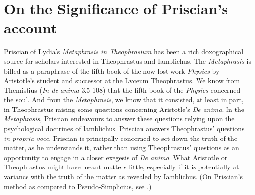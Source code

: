 \documentclass[12pt]{article}
\title{\mytitle}
\author{\myauthor}
\date{} %
\begin{document}
\maketitle
\begin{abstract} %
\noindent An \emph{aporia} posed by Theophrastus prompts Priscian to describe the process by which perception formally assimilates to its object as a progressive perfection. I present an interpretation of Priscian's account of perception's progressive perfection. And I consider a dilemma for the general class of accounts to which Priscian's belongs based on related problems raised by Plotinus and Aquinas.
\end{abstract}

\setlength{\parindent}{1em}


\section{On the Significance of Priscian's account} %
\label{sec:on_the_significance_of_priscian_s_account}

Priscian of Lydia's \emph{Metaphrasis in Theophrastum} has been a rich doxographical source for scholars interested in Theophrastus and Iamblichus. The \emph{Metaphrasis} is billed as a paraphrase of the fifth book of the now lost work \emph{Physics} by Aristotle's student and successor at the Lyceum Theophrastus. We know from Themistius (\emph{In de anima} 3.5 108) that the fifth book of the \emph{Physics} concerned the soul. And from the \emph{Metaphrasis}, we know that it consisted, at least in part, in Theophrastus raising some questions concerning Aristotle's \emph{De anima}. In the \emph{Metaphrasis}, Priscian endeavours to answer these questions relying upon the psychological doctrines of Iamblichus. Priscian answers Theophrastus' questions \emph{in propria voce}. Priscian is principally concerned to set down the truth of the matter, as he understands it, rather than using Theophrastus' questions as an opportunity to engage in a closer exegesis of \emph{De anima}. What Aristotle or Theophrastus might have meant matters little, especially if it is potentially at variance with the truth of the matter as revealed by Iamblichus. (On Priscian's method as compared to Pseudo-Simplicius, see \citealt[7--10]{Steel:1978th}.)
\end{document}
